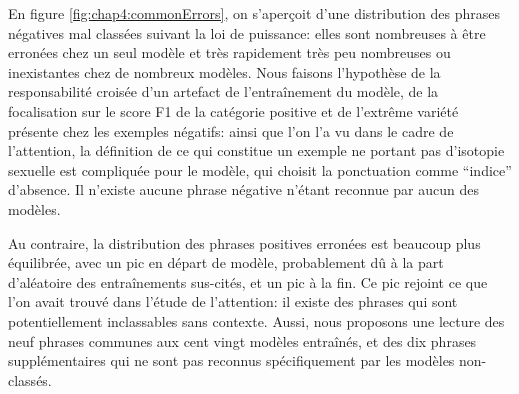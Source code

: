 En figure \ref{fig:chap4:commonErrors}, on s'aperçoit d'une distribution des phrases négatives mal classées suivant la loi de puissance: elles sont nombreuses à être erronées chez un seul modèle et très rapidement très peu nombreuses ou inexistantes chez de nombreux modèles. Nous faisons l'hypothèse de la responsabilité croisée d'un artefact de l'entraînement du modèle, de la focalisation sur le score F1 de la catégorie positive et de l'extrême variété présente chez les exemples négatifs: ainsi que l'on l'a vu dans le cadre de l'attention, la définition de ce qui constitue un exemple ne portant pas d'isotopie sexuelle est compliquée pour le modèle, qui choisit la ponctuation comme ``indice'' d'absence. Il n'existe aucune phrase négative n'étant reconnue par aucun des modèles.

Au contraire, la distribution des phrases positives erronées est beaucoup plus équilibrée, avec un pic en départ de modèle, probablement dû à la part d'aléatoire des entraînements sus-cités, et un pic à la fin. Ce pic rejoint ce que l'on avait trouvé dans l'étude de l'attention: il existe des phrases qui sont potentiellement inclassables sans contexte. Aussi, nous proposons une lecture des neuf phrases communes aux cent vingt modèles entraînés, et des dix phrases supplémentaires qui ne sont pas reconnus spécifiquement par les modèles non-classés.


